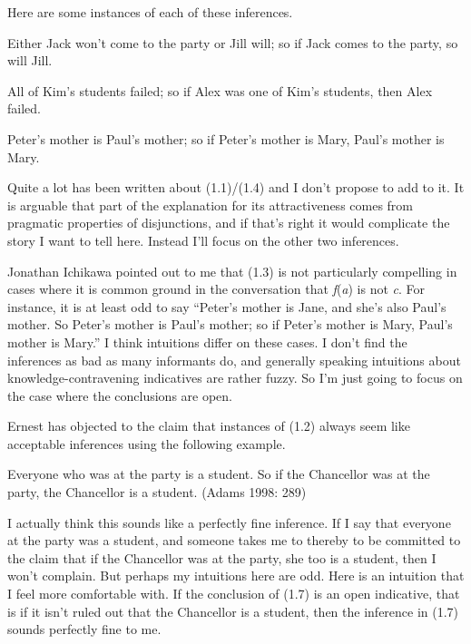 \noindent Here are some instances of each of these inferences.

\begin{enumerate*}
\setcounter{enumi}{3}
\item Either Jack won't come to the party or Jill will; so if Jack comes to the party, so will Jill.

\item All of Kim's students failed; so if Alex was one of Kim's students, then Alex failed.

\item Peter's mother is Paul's mother; so if Peter's mother is Mary, Paul's mother is Mary.
\end{enumerate*}

\noindent Quite a lot has been written about (1.1)/(1.4) and I don't propose to add to it. It is arguable that part of the explanation for its attractiveness comes from pragmatic properties of disjunctions, and if that's right it would complicate the story I want to tell here. Instead I'll focus on the other two inferences.

Jonathan Ichikawa pointed out to me that (1.3) is not particularly compelling in cases where it is common ground in the conversation that \textit{f}(\textit{a}) is not \textit{c}. For instance, it is at least odd to say ``Peter's mother is Jane, and she's also Paul's mother. So Peter's mother is Paul's mother; so if Peter's mother is Mary, Paul's mother is Mary.'' I think intuitions differ on these cases. I don't find the inferences as bad as many informants do, and generally speaking intuitions about knowledge-contravening indicatives are rather fuzzy. So I'm just going to focus on the case where the conclusions are open.

Ernest \cite{Adams1998} has objected to the claim that instances of (1.2) always seem like acceptable inferences using the following example.

\renewcommand{\labelenumi}{(1.\arabic{enumi})}
\begin{enumerate*}
\setcounter{enumi}{6}
\item Everyone who was at the party is a student. So if the Chancellor was at the party, the Chancellor is a student. (Adams 1998: 289)
\end{enumerate*}

\noindent I actually think this sounds like a perfectly fine inference. If I say that everyone at the party was a student, and someone takes me to thereby to be committed to the claim that if the Chancellor was at the party, she too is a student, then I won't complain. But perhaps my intuitions here are odd. Here is an intuition that I feel more comfortable with. If the conclusion of (1.7) is an open indicative, that is if it isn't ruled out that the Chancellor is a student, then the inference in (1.7) sounds perfectly fine to me.

